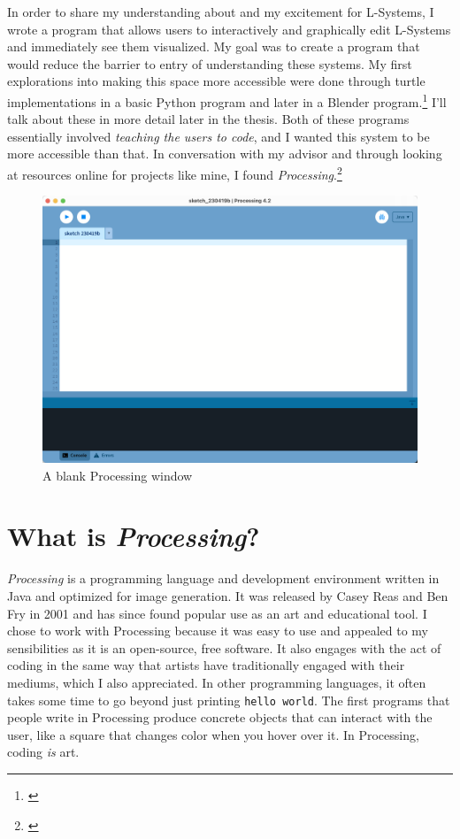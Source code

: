 \documentclass[12pt,twoside]{reedthesis}
\newcommand{\code}[1]{\texttt{#1}}
\begin{document}
	In order to share my understanding about and my excitement for L-Systems, I wrote a program that allows users to interactively and graphically edit L-Systems and immediately see them visualized. My goal was to create a program that would reduce the barrier to entry of understanding these systems. My first explorations into making this space more accessible were done through turtle implementations in a basic Python program and later in a Blender program.\footnote{\cite{Blender2018}} I'll talk about these in more detail later in the thesis. Both of these programs essentially involved \textit{teaching the users to code}, and I wanted this system to be more accessible than that. In conversation with my advisor and through looking at resources online for projects like mine, I found \textit{Processing}.\footnote{\cite{processing2014}}
	
		
	\begin{figure}[h!]
	\centering
	\includegraphics[scale=0.3, frame]{Images/ProcessingWindow}
	\caption{A blank Processing window}
	\label {ProcessingWindow}
	\end{figure}
	
\section{What is \textit{Processing}?}


	\textit{Processing} is a programming language and development environment written in Java and optimized for image generation. It was released by Casey Reas and Ben Fry in 2001 and has since found popular use as an art and educational tool. I chose to work with Processing because it was easy to use and appealed to my sensibilities as it is an open-source, free software. It also engages with the act of coding in the same way that artists have traditionally engaged with their mediums, which I also appreciated. In other programming languages, it often takes some time to go beyond just printing \code{hello world}. The first programs that people write in Processing produce concrete objects that can interact with the user, like a square that changes color when you hover over it. In Processing, coding \textit{is} art.
	
\end{document}
